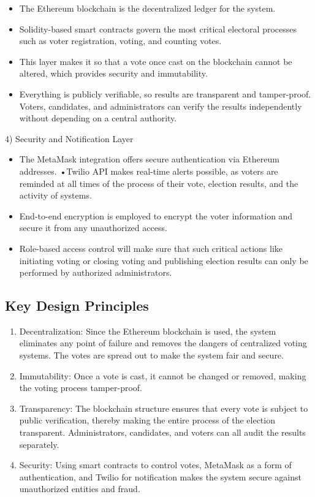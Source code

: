 \documentclass[conference]{IEEEtran}
\begin{document}
\begin{itemize}

\item The Ethereum blockchain is the decentralized ledger for the system.
\item Solidity-based smart contracts govern the most critical electoral processes such as voter registration, voting, and counting votes.
\item This layer makes it so that a vote once cast on the blockchain cannot be altered, which provides security and immutability.
\item Everything is publicly verifiable, so results are transparent and tamper-proof. Voters, candidates, and administrators can verify the results independently without depending on a central authority.
\end{itemize}
4) Security and Notification Layer
\begin{itemize}
\item The MetaMask integration offers secure authentication via Ethereum addresses.
•Twilio API makes real-time alerts possible, as voters are reminded at all times of the process of their vote, election results, and the activity of systems.
\item End-to-end encryption is employed to encrypt the voter information and secure it from any unauthorized access. \item Role-based access control will make sure that such critical actions like initiating voting or closing voting and publishing election results can only be performed by authorized administrators. \end{itemize}

\subsection{Key Design Principles}
\begin{enumerate}
    \item Decentralization: Since the Ethereum blockchain is used, the system eliminates any point of failure and removes the dangers of centralized voting systems. The votes are spread out to make the system fair and secure.
\item Immutability: Once a vote is cast, it cannot be changed or removed, making the voting process tamper-proof.
\item Transparency: The blockchain structure ensures that every vote is subject to public verification, thereby making the entire process of the election transparent. Administrators, candidates, and voters can all audit the results separately.
\item Security: Using smart contracts to control votes, MetaMask as a form of authentication, and Twilio for notification makes the system secure against unauthorized entities and fraud.
\end{enumerate}
\end{document}

